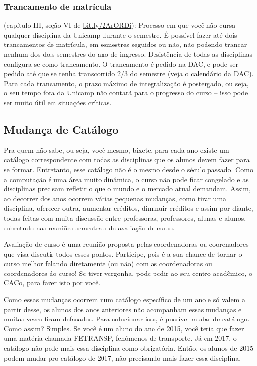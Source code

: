 \subsubsection{Trancamento de matrícula} (capítulo III, seção VI de
\url{bit.ly/2ArORDi}): Processo em que você não cursa qualquer disciplina da
Unicamp durante o semestre. É possível fazer até dois trancamentos de
matrícula, em semestres seguidos ou não, não podendo trancar nenhum dos dois
semestres do ano de ingresso. Desistência de todas as disciplinas configura-se
como trancamento. O trancamento é pedido na DAC, e pode ser pedido até que se
tenha transcorrido 2/3 do semestre (veja o calendário da DAC). Para cada
trancamento, o prazo máximo de integralização é postergado, ou seja, o seu
tempo fora da Unicamp não contará para o progresso do curso -- isso pode ser
muito útil em situações críticas.

\subsection{Mudança de Catálogo}

Pra quem não sabe, ou seja, você mesmo, bixete, para cada ano existe um
catálogo correspondente com todas as disciplinas que os alunos devem fazer para
se formar. Entretanto, esse catálogo não é o mesmo desde o século passado. Como
a computação é uma área muito dinâmica, o curso não pode ficar congelado e as
disciplinas precisam refletir o que o mundo e o mercado atual demandam. Assim,
ao decorrer dos anos ocorrem várias pequenas mudanças, como tirar uma
disciplina, oferecer outra, aumentar créditos, diminuir créditos e assim por
diante, todas feitas com muita discussão entre professoras, professores, alunas
e alunos, sobretudo nas reuniões semestrais de avaliação de curso.

Avaliação de curso é uma reunião proposta pelas coordenadoras ou coorenadores
que visa discutir todos esses pontos. Participe, pois é a sua chance de tornar
o curso melhor falando diretamente (ou não) com as coordenadoras ou
coordenadores do curso! Se tiver vergonha, pode pedir ao seu centro acadêmico,
o CACo, para fazer isto por você.

Como essas mudanças ocorrem num catálogo específico de um ano e só valem a
partir desse, os alunos dos anos anteriores não acompanham essas mudanças e
muitas vezes ficam defasados. Para solucionar isso, é possível mudar de
catálogo. Como assim? Simples. Se você é um aluno do ano de 2015, você teria
que fazer uma matéria chamada FETRANSP, fenômenos de transporte. Já em 2017, o
catálogo não pede mais essa disciplina como obrigatória. Então, os alunos de
2015 podem mudar pro catálogo de 2017, não precisando mais fazer essa
disciplina.

